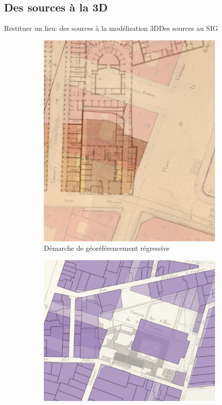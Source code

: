 \documentclass[8pt]{beamer}
\begin{document}
\subsection{Des sources à la 3D}
\begin{frame}{Restituer un lieu: des sources à la modélisation 3D}{Des sources au SIG}
	\begin{figure}
		\begin{subfigure}{0.48\textwidth}
			\includegraphics[width=\textwidth]{includes/c_slide2_0.png}
			\caption{Démarche de géoréférencement régressive}
		\end{subfigure}
		\begin{subfigure}{0.48\textwidth}
			\includegraphics[width=\textwidth]{includes/c_slide2_1.png}

\end{subfigure}
\end{figure}
\end{frame}
\end{document}
